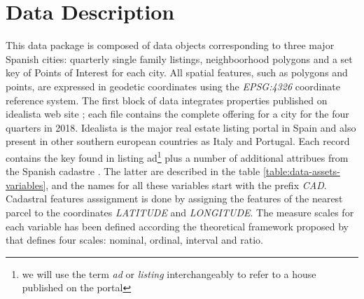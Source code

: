 \documentclass[times,final]{elsarticle}
\begin{document}
\section*{Data Description}

\noindent

This data package is composed of data objects corresponding to three major Spanish cities: quarterly single family listings, neighboorhood polygons and a set key of Points of Interest for each city. All spatial features, such as polygons and points, are expressed in geodetic coordinates using the \emph{EPSG:4326} coordinate reference system. The first block of data integrates properties published on idealista web site \cite{idealista}; each file contains the complete offering for a city for the four quarters in 2018. Idealista is the major real estate listing portal in Spain and also present in other southern european countries as Italy and Portugal. Each record contains the key found in listing ad\footnote{we will use the term \emph{ad} or \emph{listing} interchangeably to refer to a house published on the portal} plus a number of additional attribues from the Spanish cadastre \cite{Catastro}. The latter are described in the table \ref{table:data-assets-variables}, and the names for all these variables start with the prefix \emph{CAD}. Cadastral features asssignment is done by assigning the features of the nearest parcel to the coordinates \emph{LATITUDE} and \emph{LONGITUDE}. The measure scales for each variable has been defined according the theoretical framework proposed by \cite{stevens1946theory} that defines four scales: nominal, ordinal, interval and ratio.
\end{document}

